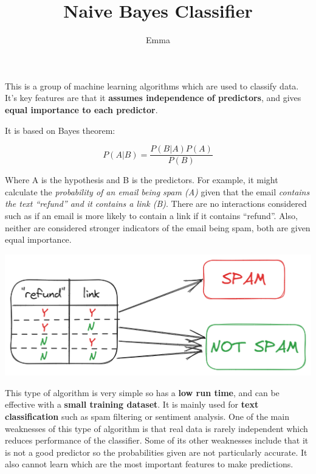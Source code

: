 \documentclass[
]{article}
\title{Naive Bayes Classifier}
\author{Emma}
\date{}
\begin{document}
\maketitle

This is a group of machine learning algorithms which are used to
classify data. It's key features are that it \textbf{assumes
independence of predictors}, and gives \textbf{equal importance to each
predictor}.

It is based on Bayes theorem:

\[P(A|B) = \frac{P(B|A)P(A)}{P(B)}\]

Where A is the hypothesis and B is the predictors. For example, it might
calculate the \emph{probability of an email being spam (A)} given that
the email \emph{contains the text ``refund'' and it contains a link
(B)}. There are no interactions considered such as if an email is more
likely to contain a link if it contains ``refund''. Also, neither are
considered stronger indicators of the email being spam, both are given
equal importance.

\includegraphics{spam_filter.png}

This type of algorithm is very simple so has a \textbf{low run time},
and can be effective with a \textbf{small training dataset}. It is
mainly used for \textbf{text classification} such as spam filtering or
sentiment analysis. One of the main weaknesses of this type of algorithm
is that real data is rarely independent which reduces performance of the
classifier. Some of its other weaknesses include that it is not a good
predictor so the probabilities given are not particularly accurate. It
also cannot learn which are the most important features to make
predictions.
\end{document}
